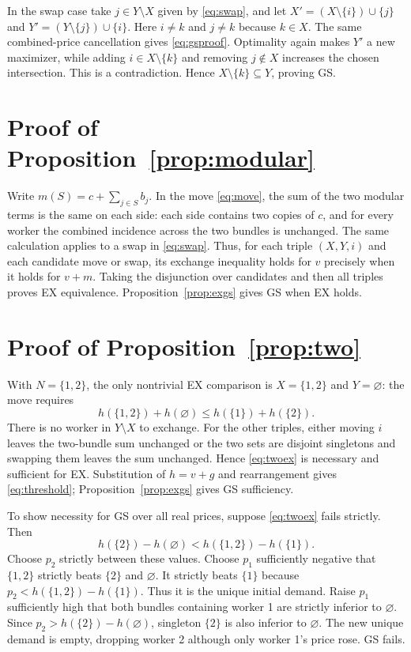 \documentclass[11pt]{article}
\theoremstyle{definition}
\theoremstyle{remark}
\numberwithin{equation}{section}
\begin{document}
In the swap case take $j\in Y\setminus X$ given by \eqref{eq:swap}, and let $X'=(X\setminus\{i\})\cup\{j\}$ and $Y'=(Y\setminus\{j\})\cup\{i\}$. Here $i\ne k$ and $j\ne k$ because $k\in X$. The same combined-price cancellation gives \eqref{eq:gsproof}. Optimality again makes $Y'$ a new maximizer, while adding $i\in X\setminus\{k\}$ and removing $j\notin X$ increases the chosen intersection. This is a contradiction. Hence $X\setminus\{k\}\subseteq Y$, proving GS.

\section{Proof of Proposition~\ref{prop:modular}}\label{app:modular}

Write $m(S)=c+\sum_{j\in S}b_j$. In the move \eqref{eq:move}, the sum of the two modular terms is the same on each side: each side contains two copies of $c$, and for every worker the combined incidence across the two bundles is unchanged. The same calculation applies to a swap in \eqref{eq:swap}. Thus, for each triple $(X,Y,i)$ and each candidate move or swap, its exchange inequality holds for $v$ precisely when it holds for $v+m$. Taking the disjunction over candidates and then all triples proves EX equivalence. Proposition~\ref{prop:exgs} gives GS when EX holds.

\section{Proof of Proposition~\ref{prop:two}}\label{app:two}

With $N=\{1,2\}$, the only nontrivial EX comparison is $X=\{1,2\}$ and $Y=\varnothing$: the move requires
\begin{equation}
h(\{1,2\})+h(\varnothing)\le h(\{1\})+h(\{2\}). \label{eq:twoex}
\end{equation}
There is no worker in $Y\setminus X$ to exchange. For the other triples, either moving $i$ leaves the two-bundle sum unchanged or the two sets are disjoint singletons and swapping them leaves the sum unchanged. Hence \eqref{eq:twoex} is necessary and sufficient for EX. Substitution of $h=v+g$ and rearrangement gives \eqref{eq:threshold}; Proposition~\ref{prop:exgs} gives GS sufficiency.

To show necessity for GS over all real prices, suppose \eqref{eq:twoex} fails strictly. Then
\[
h(\{2\})-h(\varnothing)
<h(\{1,2\})-h(\{1\}).
\]
Choose $p_2$ strictly between these values. Choose $p_1$ sufficiently negative that $\{1,2\}$ strictly beats $\{2\}$ and $\varnothing$. It strictly beats $\{1\}$ because $p_2<h(\{1,2\})-h(\{1\})$. Thus it is the unique initial demand. Raise $p_1$ sufficiently high that both bundles containing worker 1 are strictly inferior to $\varnothing$. Since $p_2>h(\{2\})-h(\varnothing)$, singleton $\{2\}$ is also inferior to $\varnothing$. The new unique demand is empty, dropping worker 2 although only worker 1's price rose. GS fails.
\end{document}
